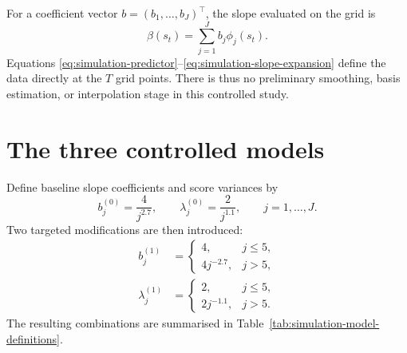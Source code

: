 For a coefficient vector $b=(b_1,\ldots,b_J)^\top$, the slope evaluated on the
grid is
\begin{equation}
    \beta(s_t)=\sum_{j=1}^{J}b_j\phi_j(s_t).
    \label{eq:simulation-slope-expansion}
\end{equation}
Equations \eqref{eq:simulation-predictor}--\eqref{eq:simulation-slope-expansion}
define the data directly at the $T$ grid points.  There is thus no preliminary
smoothing, basis estimation, or interpolation stage in this controlled study.

\section{The three controlled models}
\label{sec:simulation-models}

Define baseline slope coefficients and score variances by
\begin{equation}
    b_j^{(0)}=\frac{4}{j^{2.7}},
    \qquad
    \lambda_j^{(0)}=\frac{2}{j^{1.1}},
    \qquad j=1,\ldots,J.
    \label{eq:simulation-baseline-sequences}
\end{equation}
Two targeted modifications are then introduced:
\begin{align}
    b_j^{(1)}
    &=
    \begin{cases}
        4, & j\leq5,\\
        4j^{-2.7}, & j>5,
    \end{cases}
    \label{eq:simulation-modified-slope}\\
    \lambda_j^{(1)}
    &=
    \begin{cases}
        2, & j\leq5,\\
        2j^{-1.1}, & j>5.
    \end{cases}
    \label{eq:simulation-modified-spectrum}
\end{align}
The resulting combinations are summarised in
Table~\ref{tab:simulation-model-definitions}.

